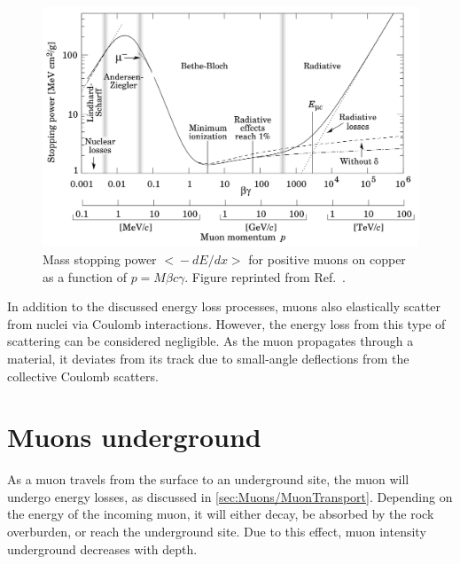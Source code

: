 \begin{figure}
    \centering
    \includegraphics[width=0.8\linewidth]{figures/Muons/MassMuonStoppingPowerOfMuonsOnCu.png}
    \caption[Mass stopping power $\big<-dE/dx\big>$ for positive muons on copper as a function of $p=M\beta c\gamma$.]{Mass stopping power $\big<-dE/dx\big>$ for positive muons on copper as a function of $p=M\beta c\gamma$. Figure reprinted from Ref.~\cite{GROOM2001183}.}
    \label{fig:Muons/StoppingPowerOffMuonsCu}
\end{figure}
In addition to the discussed energy loss processes, muons also elastically scatter from nuclei via Coulomb interactions. However, the energy loss from this type of scattering can be considered negligible. As the muon propagates through a material, it deviates from its track due to small-angle deflections from the collective Coulomb scatters. 

\section{Muons underground}\label{sec:Muons/MuonsUnderground}
As a muon travels from the surface to an underground site, the muon will undergo energy losses, as discussed in \autoref{sec:Muons/MuonTransport}. Depending on the energy of the incoming muon, it will either decay, be absorbed by the rock overburden, or reach the underground site. Due to this effect, muon intensity underground decreases with depth.

